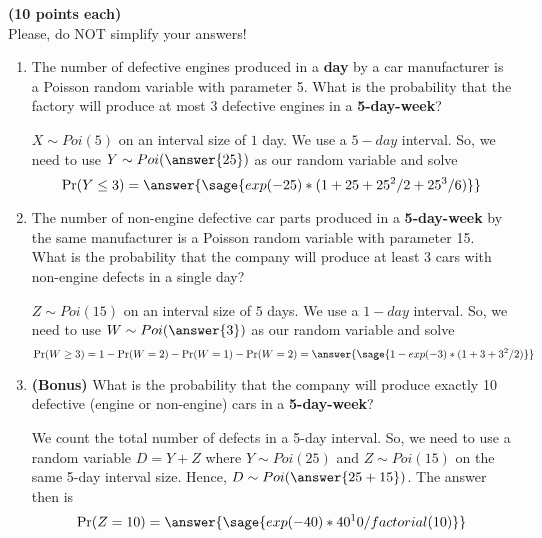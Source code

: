 \documentclass{ximera}
\begin{document}

\begin{problem}
{\bf (10 points each)} \\
\large Please, do NOT simplify your answers!
\begin{enumerate}
    \item The number of defective engines produced in a {\bf day} by a car manufacturer is a Poisson random variable with parameter 5. What is the probability that the factory will produce at most 3 defective engines in a {\bf 5-day-week}?

\begin{prompt}    
    $X\sim Poi(5)$ on an interval size of $1$ day. We use a $5-day$ interval. So, we need to use $Y\sim Poi(\answer{25})$ as our random variable and solve
    $$\Pr(Y\leq 3)=\answer{\sage{exp(-25)*(1+25+25^2/2+25^3/6)}}$$
\end{prompt}

    \item The number of non-engine defective car parts produced in a {\bf 5-day-week} by the same manufacturer is a Poisson random variable with parameter 15. What is the probability that the company will produce at least 3 cars with non-engine defects in a single day?

\begin{prompt}    
    $Z\sim Poi(15)$ on an interval size of $5$ days. We use a 
    $1-day$ interval. So, we need to use $W\sim Poi(\answer{3})$ as our random variable and solve
    $$\Pr(W\geq 3)=1-\Pr(W=2)-\Pr(W=1)-\Pr(W=2)=\answer{\sage{1-exp(-3)*(1+3+3^2/2)}}$$
\end{prompt}    

    \item {\bf (Bonus)} What is the probability that the company will produce exactly 10 defective (engine or non-engine) cars in a {\bf 5-day-week}?

\begin{prompt}    
We count the total number of defects in a 5-day interval. So, we need to use a random variable $D=Y+Z$ where $Y\sim Poi(25)$ and $Z\sim Poi(15)$ on the same 5-day interval size. Hence, $D\sim Poi(\answer{25+15})$. The answer then is
    $$\Pr(Z=10)=\answer{\sage{exp(-40)*40^10/factorial(10)}}$$
\end{prompt}    


\end{enumerate}
\end{problem}
\end{document}

